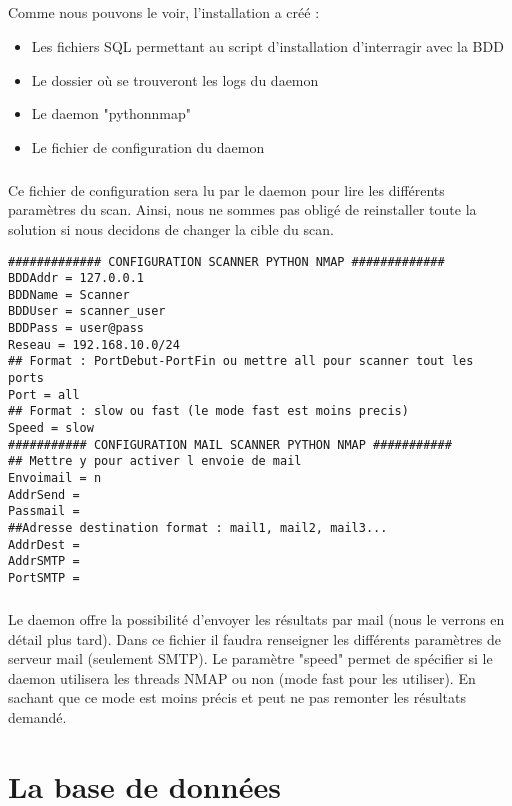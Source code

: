\documentclass[12pt]{report}
\begin{document}
		\paragraph{}
			Comme nous pouvons le voir, l'installation a créé :
			\begin{itemize}
				\item Les fichiers SQL permettant au script d'installation d'interragir avec la BDD
				\item Le dossier où se trouveront les logs du daemon
				\item Le daemon "pythonnmap"
				\item Le fichier de configuration du daemon
			\end{itemize}
		\paragraph{}
			Ce fichier de configuration sera lu par le daemon pour lire les différents paramètres du scan. Ainsi, nous ne sommes pas obligé de reinstaller toute la solution si nous decidons de changer la cible du scan.
			\begin{lstlisting}[caption=Exemple fichier de configuration, captionpos=b]
############# CONFIGURATION SCANNER PYTHON NMAP #############
BDDAddr = 127.0.0.1
BDDName = Scanner
BDDUser = scanner_user
BDDPass = user@pass
Reseau = 192.168.10.0/24
## Format : PortDebut-PortFin ou mettre all pour scanner tout les ports
Port = all
## Format : slow ou fast (le mode fast est moins precis)
Speed = slow
########### CONFIGURATION MAIL SCANNER PYTHON NMAP ###########
## Mettre y pour activer l envoie de mail
Envoimail = n
AddrSend = 
Passmail = 
##Adresse destination format : mail1, mail2, mail3...
AddrDest = 
AddrSMTP = 
PortSMTP =

			\end{lstlisting}
		\paragraph{}
			Le daemon offre la possibilité d'envoyer les résultats par mail (nous le verrons en détail plus tard). Dans ce fichier il faudra renseigner les différents paramètres de serveur mail (seulement SMTP). Le paramètre "speed" permet de spécifier si le daemon utilisera les threads NMAP ou non (mode fast pour les utiliser). En sachant que ce mode est moins précis et peut ne pas remonter les résultats demandé.
	\chapter{La base de données}
\end{document}
